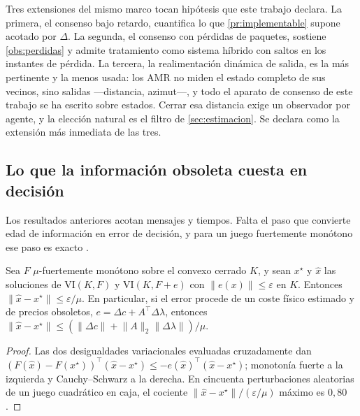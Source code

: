 \begin{observacion}
\label{obs:hibrido-restante}
Tres extensiones del mismo marco tocan hipótesis que este trabajo declara.
La primera, el consenso bajo retardo, cuantifica lo que \cref{pr:implementable}
supone acotado por $\Delta$. La segunda, el consenso con pérdidas de paquetes,
sostiene \cref{obs:perdidas} y admite tratamiento como sistema híbrido con
saltos en los instantes de pérdida. La tercera, la realimentación dinámica de
salida, es la más pertinente y la menos usada: los AMR no miden el estado
completo de sus vecinos, sino salidas —distancia, azimut—, y todo el aparato de
consenso de este trabajo se ha escrito sobre estados. Cerrar esa distancia exige
un observador por agente, y la elección natural es el filtro de
\cref{sec:estimacion}. Se declara como la extensión más inmediata de las tres.
\end{observacion}

\subsection{Lo que la información obsoleta cuesta en decisión}

Los resultados anteriores acotan mensajes y tiempos. Falta el paso que
convierte edad de información en error de decisión, y para un juego
fuertemente monótono ese paso es exacto \cite{mayorga2026compendio}.

\begin{teorema}
\label{th:vi-robusta}
Sea $F$ $\mu$-fuertemente monótono sobre el convexo cerrado $K$, y sean
$x^\star$ y $\hat x$ las soluciones de $\mathrm{VI}(K,F)$ y
$\mathrm{VI}(K,F+e)$ con $\lVert e(x)\rVert\le\varepsilon$ en $K$. Entonces
$\lVert\hat x-x^\star\rVert\le\varepsilon/\mu$. En particular, si el error
procede de un coste físico estimado y de precios obsoletos,
$e=\Delta c+A^{\!\top}\Delta\lambda$, entonces
$\lVert\hat x-x^\star\rVert\le(\lVert\Delta c\rVert+\lVert A\rVert_2\lVert\Delta\lambda\rVert)/\mu$.
\end{teorema}

\begin{proof}
Las dos desigualdades variacionales evaluadas cruzadamente dan
$(F(\hat x)-F(x^\star))^{\!\top}(\hat x-x^\star)\le-e(\hat x)^{\!\top}(\hat x-x^\star)$;
monotonía fuerte a la izquierda y Cauchy--Schwarz a la derecha. En cincuenta
perturbaciones aleatorias de un juego cuadrático en caja, el cociente
$\lVert\hat x-x^\star\rVert/(\varepsilon/\mu)$ máximo es $0{,}80$.
\end{proof}

